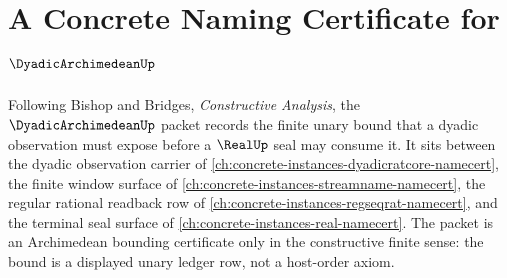 \chapter{A Concrete Naming Certificate for $\DyadicArchimedeanUp$}
\label{ch:concrete-instances-dyadicarchimedean-namecert}

Following Bishop and Bridges, \emph{Constructive Analysis}, the $\DyadicArchimedeanUp$ packet records the finite unary bound that a dyadic observation must expose before a $\RealUp$ seal may consume it. It sits between the dyadic observation carrier of \autoref{ch:concrete-instances-dyadicratcore-namecert}, the finite window surface of \autoref{ch:concrete-instances-streamname-namecert}, the regular rational readback row of \autoref{ch:concrete-instances-regseqrat-namecert}, and the terminal seal surface of \autoref{ch:concrete-instances-real-namecert}. The packet is an Archimedean bounding certificate only in the constructive finite sense: the bound is a displayed unary ledger row, not a host-order axiom.

